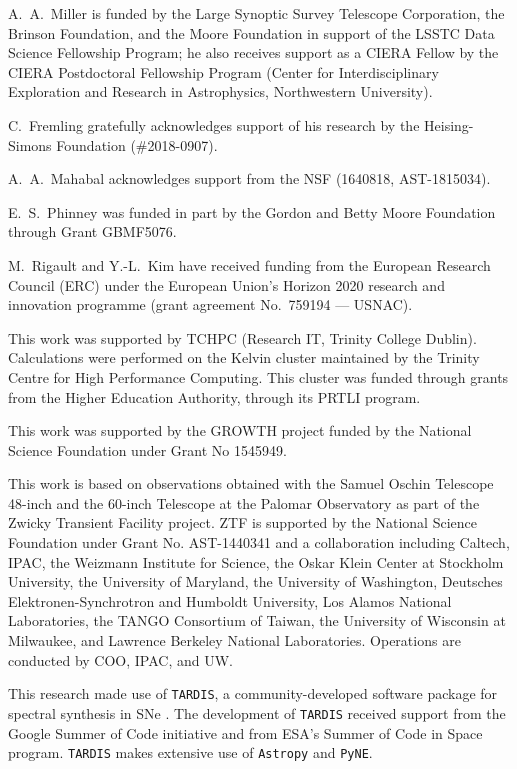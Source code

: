 \documentclass[twocolumn]{aastex63}
\begin{document}
A.~A.~Miller is funded by the Large Synoptic Survey Telescope Corporation, the
Brinson Foundation, and the Moore Foundation in support of the LSSTC Data
Science Fellowship Program; he also receives support as a CIERA Fellow by the
CIERA Postdoctoral Fellowship Program (Center for Interdisciplinary
Exploration and Research in Astrophysics, Northwestern University).

C.~Fremling gratefully acknowledges support of his research by the
Heising-Simons Foundation (\#2018-0907).

A.~A.~Mahabal acknowledges support from the NSF (1640818, AST-1815034).

E.~S.~Phinney was funded in part by the Gordon and Betty Moore Foundation
through Grant GBMF5076.

M.~Rigault and Y.-L.~Kim have received funding from the European Research
Council (ERC) under the European Union’s Horizon 2020 research and innovation
programme (grant agreement No.\ 759194 — USNAC).

This work was supported by TCHPC (Research IT, Trinity College Dublin).
Calculations were performed on the Kelvin cluster maintained by the Trinity
Centre for High Performance Computing. This cluster was funded through grants
from the Higher Education Authority, through its PRTLI program.

This work was supported by the GROWTH project funded by the National Science
Foundation under Grant No 1545949.

This work is based on observations obtained with the Samuel Oschin Telescope
48-inch and the 60-inch Telescope at the Palomar Observatory as part of the
Zwicky Transient Facility project. ZTF is supported by the National Science
Foundation under Grant No. AST-1440341 and a collaboration including Caltech,
IPAC, the Weizmann Institute for Science, the Oskar Klein Center at Stockholm
University, the University of Maryland, the University of Washington,
Deutsches Elektronen-Synchrotron and Humboldt University, Los Alamos National
Laboratories, the TANGO Consortium of Taiwan, the University of Wisconsin at
Milwaukee, and Lawrence Berkeley National Laboratories. Operations are
conducted by COO, IPAC, and UW.

This research made use of \texttt{TARDIS}, a community-developed software
package for spectral synthesis in SNe \citep{Kerzendorf14}. The development of
\texttt{TARDIS} received support from the Google Summer of Code initiative and
from ESA's Summer of Code in Space program. \texttt{TARDIS} makes extensive
use of \texttt{Astropy} and \texttt{PyNE}.
\end{document}
